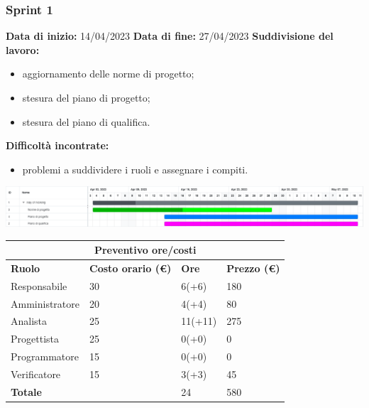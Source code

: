\documentclass[a4paper, 12pt]{article}
\begin{document}
\subsubsection{Sprint 1}
\textbf{Data di inizio:} 14/04/2023\newline
\textbf{Data di fine:} 27/04/2023\newline
\newline
\textbf{Suddivisione del lavoro:}
\begin{itemize}
    \item aggiornamento delle norme di progetto;
    \item stesura del piano di progetto;
    \item stesura del piano di qualifica.
\end{itemize}
\textbf{Difficoltà incontrate:}
\begin{itemize}
    \item problemi a suddividere i ruoli e assegnare i compiti.
\end{itemize}
\includegraphics[scale=0.24]{WoW_1.png}\newline
\newline

\begin{center}
	\begin{tabularx}{\textwidth}{|X|X|X|X|}
		\hline
		\multicolumn{4}{|c|}{\textbf{Preventivo ore/costi}}                                      \\
		\hline
		\hline
		\textbf{Ruolo}  & \textbf{Costo orario (\euro)} & \textbf{Ore} & \textbf{Prezzo (\euro)} \\
		\hline
		Responsabile    & 30                            & 6(+6)        & 180                     \\
		\hline
		Amministratore  & 20                            & 4(+4)        & 80                     \\
		\hline
		Analista        & 25                            & 11(+11)      & 275                     \\
		\hline
		Progettista     & 25                            & 0(+0)        & 0                       \\
		\hline
		Programmatore   & 15                            & 0(+0)        & 0                       \\
		\hline
		Verificatore    & 15                            & 3(+3)        & 45                      \\
		\hline
		\hline
		\textbf{Totale} &                               & 24           & 580                     \\
		\hline
	\end{tabularx}\\[8pt]
	\mbox{}\\
\end{center}
\end{document}
